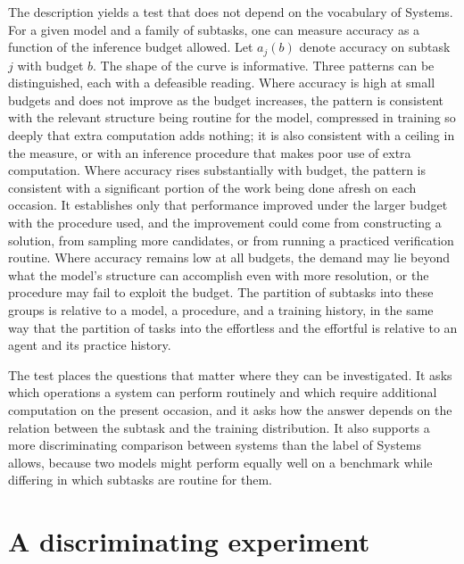 \documentclass[11pt]{report}
\theoremstyle{remark}
\theoremstyle{definition}
\begin{document}
The description yields a test that does not depend on the vocabulary of Systems. For a given model and a family of subtasks, one can measure accuracy as a function of the inference budget allowed. Let $a_j(b)$ denote accuracy on subtask $j$ with budget $b$. The shape of the curve is informative. Three patterns can be distinguished, each with a defeasible reading. Where accuracy is high at small budgets and does not improve as the budget increases, the pattern is consistent with the relevant structure being routine for the model, compressed in training so deeply that extra computation adds nothing; it is also consistent with a ceiling in the measure, or with an inference procedure that makes poor use of extra computation. Where accuracy rises substantially with budget, the pattern is consistent with a significant portion of the work being done afresh on each occasion. It establishes only that performance improved under the larger budget with the procedure used, and the improvement could come from constructing a solution, from sampling more candidates, or from running a practiced verification routine. Where accuracy remains low at all budgets, the demand may lie beyond what the model's structure can accomplish even with more resolution, or the procedure may fail to exploit the budget. The partition of subtasks into these groups is relative to a model, a procedure, and a training history, in the same way that the partition of tasks into the effortless and the effortful is relative to an agent and its practice history.

The test places the questions that matter where they can be investigated. It asks which operations a system can perform routinely and which require additional computation on the present occasion, and it asks how the answer depends on the relation between the subtask and the training distribution. It also supports a more discriminating comparison between systems than the label of Systems allows, because two models might perform equally well on a benchmark while differing in which subtasks are routine for them.

\section{A discriminating experiment}
\end{document}
